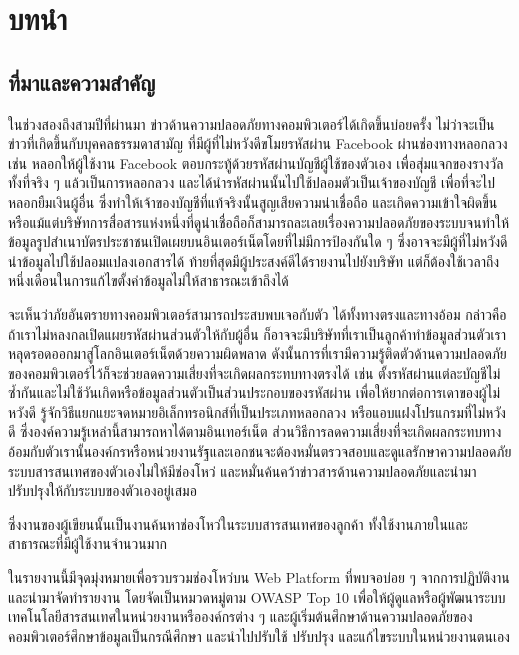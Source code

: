 \chapter{บทนำ}
\label{chapter:introduction}

\section{ที่มาและความสำคัญ}

ในช่วงสองถึงสามปีที่ผ่านมา ข่าวด้านความปลอดภัยทางคอมพิวเตอร์ได้เกิดขึ้นบ่อยครั้ง ไม่ว่าจะเป็นข่าวที่เกิดขึ้นกับบุคคลธรรมดาสามัญ ที่มีผู้ที่ไม่หวังดีขโมยรหัสผ่าน Facebook ผ่านช่องทางหลอกลวง เช่น หลอกให้ผู้ใช้งาน Facebook ตอบกระทู้ด้วยรหัสผ่านบัญชีผู้ใช้ของตัวเอง เพื่อสุ่มแจกของรางวัล ทั้งที่จริง ๆ แล้วเป็นการหลอกลวง และได้นำรหัสผ่านนั้นไปใช้ปลอมตัวเป็นเจ้าของบัญชี เพื่อที่จะไปหลอกยืมเงินผู้อื่น ซึ่งทำให้เจ้าของบัญชีที่แท้จริงนั้นสูญเสียความน่าเชื่อถือ และเกิดความเข้าใจผิดขึ้น หรือแม้แต่บริษัทการสื่อสารแห่งหนึ่งที่ดูน่าเชื่อถือก็สามารถละเลยเรื่องความปลอดภัยของระบบจนทำให้ข้อมูลรูปสำเนาบัตรประชาชนเปิดเผยบนอินเตอร์เน็ตโดยที่ไม่มีการป้องกันใด ๆ ซึ่งอาจจะมีผู้ที่ไม่หวังดีนำข้อมูลไปใช้ปลอมแปลงเอกสารได้ ท้ายที่สุดมีผู้ประสงค์ดีได้รายงานไปยังบริษัท แต่ก็ต้องใช้เวลาถึงหนึ่งเดือนในการแก้ไขตั้งค่าข้อมูลไม่ให้สาธารณะเข้าถึงได้ \cite{truemoveh}

จะเห็นว่าภัยอันตรายทางคอมพิวเตอร์สามารถประสบพบเจอกับตัว ได้ทั้งทางตรงและทางอ้อม กล่าวคือถ้าเราไม่หลงกลเปิดแผยรหัสผ่านส่วนตัวให้กับผู้อื่น ก็อาจจะมีบริษัทที่เราเป็นลูกค้าทำข้อมูลส่วนตัวเราหลุดรอดออกมาสู่โลกอินเตอร์เน็ตด้วยความผิดพลาด ดังนั้นการที่เรามีความรู้ติดตัวด้านความปลอดภัยของคอมพิวเตอร์ไว้ก็จะช่วยลดความเสี่ยงที่จะเกิดผลกระทบทางตรงได้ เช่น ตั้งรหัสผ่านแต่ละบัญชีไม่ซ้ำกันและไม่ใช้วันเกิดหรือข้อมูลส่วนตัวเป็นส่วนประกอบของรหัสผ่าน เพื่อให้ยากต่อการเดาของผู้ไม่หวังดี  รู้จักวิธีแยกแยะจดหมายอิเล็กทรอนิกส์ที่เป็นประเภทหลอกลวง หรือแอบแฝงโปรแกรมที่ไม่หวังดี ซึ่งองค์ความรู้เหล่านี้สามารถหาได้ตามอินเทอร์เน็ต ส่วนวิธีการลดความเสี่ยงที่จะเกิดผลกระทบทางอ้อมกับตัวเรานั้นองค์กรหรือหน่วยงานรัฐและเอกชนจะต้องหมั่นตรวจสอบและดูแลรักษาความปลอดภัยระบบสารสนเทศของตัวเองไม่ให้มีช่องโหว่ และหมั่นค้นคว้าข่าวสารด้านความปลอดภัยและนำมาปรับปรุงให้กับระบบของตัวเองอยู่เสมอ 

ซึ่งงานของผู้เขียนนั้นเป็นงานค้นหาช่องโหว่ในระบบสารสนเทศของลูกค้า ทั้งใช้งานภายในและสาธารณะที่มีผู้ใช้งานจำนวนมาก

ในรายงานนี้มีจุดมุ่งหมายเพื่อรวบรวมช่องโหว่บน Web Platform ที่พบจอบ่อย ๆ จากการปฏิบัติงานและนำมาจัดทำรายงาน โดยจัดเป็นหมวดหมู่ตาม OWASP Top 10 เพื่อให้ผู้ดูแลหรือผู้พัฒนาระบบเทคโนโลยีสารสนเทศในหน่วยงานหรือองค์กรต่าง ๆ และผู้เริ่มต้นศึกษาด้านความปลอดภัยของคอมพิวเตอร์ศึกษาข้อมูลเป็นกรณีศึกษา และนำไปปรับใช้ ปรับปรุง และแก้ไขระบบในหน่วยงานตนเอง

